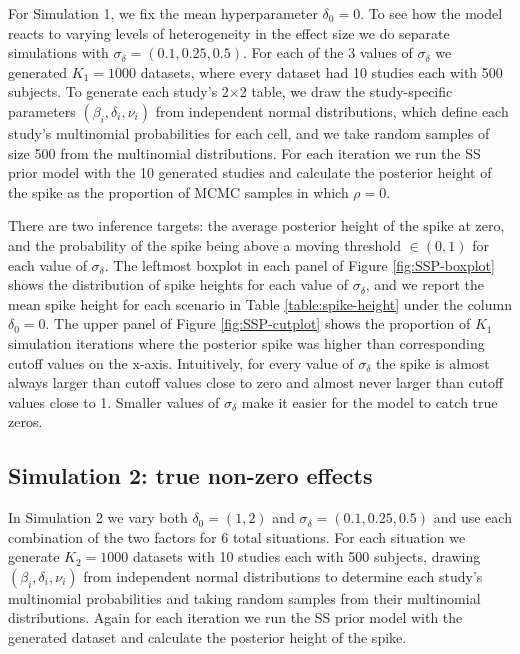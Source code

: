 \documentclass[AMA,STIX1COL]{WileyNJD-v2}
\begin{document}
For Simulation 1, we fix the mean hyperparameter $\delta_0 = 0$. To see how the model reacts to varying levels of heterogeneity in the effect size we do separate simulations with $\sigma_\delta = (0.1, 0.25, 0.5)$. For each of the 3 values of $\sigma_\delta$ we generated $K_1 = 1000$ datasets, where every dataset had 10 studies each with 500 subjects. To generate each study's 2$\times$2 table, we draw the study-specific parameters $(\beta_i, \delta_i, \nu_i)$ from independent normal distributions, which define each study's multinomial probabilities for each cell, and we take random samples of size 500 from the multinomial distributions. For each iteration we run the SS prior model with the 10 generated studies and calculate the posterior height of the spike as the proportion of MCMC samples in which $\rho = 0$. 

There are two inference targets: the average posterior height of the spike at zero, and the probability of the spike being above a moving threshold $\in (0, 1)$ for each value of $\sigma_\delta$. The leftmost boxplot in each panel of Figure \ref{fig:SSP-boxplot} shows the distribution of spike heights for each value of $\sigma_\delta$, and we report the mean spike height for each scenario in Table \ref{table:spike-height} under the column $\delta_0 = 0$. The upper panel of Figure \ref{fig:SSP-cutplot} shows the proportion of $K_1$ simulation iterations where the posterior spike was higher than corresponding cutoff values on the x-axis. Intuitively, for every value of $\sigma_\delta$ the spike is almost always larger than cutoff values close to zero and almost never larger than cutoff values close to 1. Smaller values of $\sigma_\delta$ make it easier for the model to catch true zeros. 

\subsection{Simulation 2: true non-zero effects} \label{sec:sim_nonzero}

In Simulation 2 we vary both $\delta_0 = (1, 2)$ and $\sigma_\delta = (0.1, 0.25, 0.5)$ and use each combination of the two factors for 6 total situations. For each situation we generate $K_2 = 1000$ datasets with 10 studies each with 500 subjects, drawing $(\beta_i, \delta_i, \nu_i)$ from independent normal distributions to determine each study's multinomial probabilities and taking random samples from their multinomial distributions. Again for each iteration we run the SS prior model with the generated dataset and calculate the posterior height of the spike. 
\end{document}
